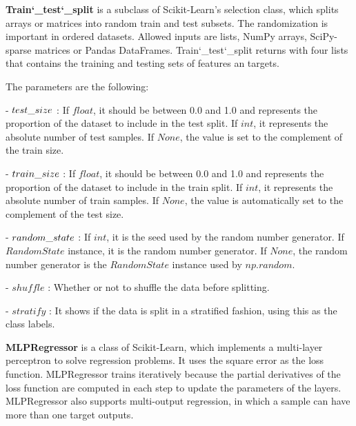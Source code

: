 \textbf{Train\char`_test\char`_split} is a subclass of Scikit-Learn's selection class, which splits arrays or matrices into random train and test subsets. The randomization is important in ordered datasets. Allowed inputs are lists, NumPy arrays, SciPy-sparse matrices or Pandas DataFrames. Train\char`_test\char`_split returns with four lists that contains the training and testing sets of features an targets.\medskip

\noindent The parameters are the following:\medskip

\noindent - $test\char`_size$ : If $float$, it should be between 0.0 and 1.0 and represents the proportion of the dataset to include in the test split. If $int$, it represents the absolute number of test samples. If $None$, the value is set to the complement of the train size. \smallskip

\noindent - $train\char`_size$ : If $float$, it should be between 0.0 and 1.0 and represents the proportion of the dataset to include in the train split. If $int$, it represents the absolute number of train samples. If $None$, the value is automatically set to the complement of the test size.\smallskip

\noindent - $random\char`_state$ : If $int$, it is the seed used by the random number generator. If $RandomState$ instance, it is the random number generator. If $None$, the random number generator is the $RandomState$ instance used by $np.random$.\smallskip

\noindent- $shuffle$ : Whether or not to shuffle the data before splitting.\smallskip

\noindent - $stratify$ : It shows if the data is split in a stratified fashion, using this as the class labels.

\newpage

\textbf{MLPRegressor} \cite{bengfort2018applied} is a class of Scikit-Learn, which implements a multi-layer perceptron to solve regression problems. It uses the square error as the loss function. MLPRegressor trains iteratively because the partial derivatives of the loss function are computed in each step to update the parameters of the layers. MLPRegressor also supports multi-output regression, in which a sample can have more than one target outputs.\medskip

